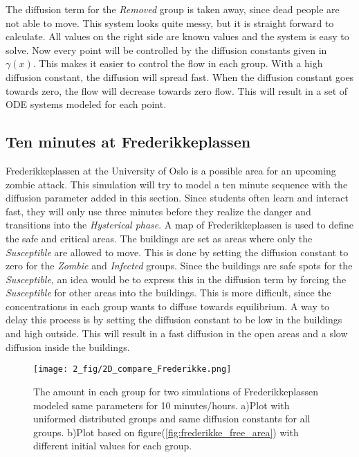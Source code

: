\documentclass[%
twoside,                 %
final,                   %
chapterprefix=true,      %
open=right               %
10pt]{book}
\begin{document}
The diffusion term for the \emph{Removed} group is taken away, since dead people are not able to move. This system looks quite messy, but it is straight forward to calculate. All values on the right side are known values and the system is easy to solve. Now every point will be controlled by the diffusion constants given in $\gamma(x)$. This makes it easier to control the flow in each group. With a high diffusion constant, the diffusion will spread fast. When the diffusion constant goes towards zero, the flow will decrease towards zero flow. This will result in a set of ODE systems modeled for each point.

\subsection{Ten minutes at Frederikkeplassen}
Frederikkeplassen at the University of Oslo is a possible area for an upcoming zombie attack. This simulation will try to model a ten minute sequence with the diffusion parameter added in this section. Since students often learn and interact fast, they will only use three minutes before they realize the danger and transitions into the \emph{Hysterical phase}. A map of Frederikkeplassen is used to define the safe and critical areas. The buildings are set as areas where only the \emph{Susceptible} are allowed to move. This is done by setting the diffusion constant to zero for the \emph{Zombie} and \emph{Infected} groups. Since the buildings are safe spots for the \emph{Susceptible}, an idea would be to express this in the diffusion term by forcing the \emph{Susceptible} for other areas into the buildings. This is more difficult, since the concentrations in each group wants to diffuse towards equilibrium. A way to delay this process is by setting the diffusion constant to be low in the buildings and high outside. This will result in a fast diffusion in the open areas and a slow diffusion inside the buildings. 


\begin{figure}[ht]
  \centerline{\texttt{[image: 2\_fig/2D\_compare\_Frederikke.png]}}
  \caption{
  \label{fig:frederikke_numbers} The amount in each group for two simulations of Frederikkeplassen modeled same parameters for 10 minutes/hours. a)Plot with uniformed distributed groups and same diffusion constants for all groups. b)Plot based on figure(\ref{fig:frederikke_free_area}) with different initial values for each group.
  }
\end{figure}
\end{document}
